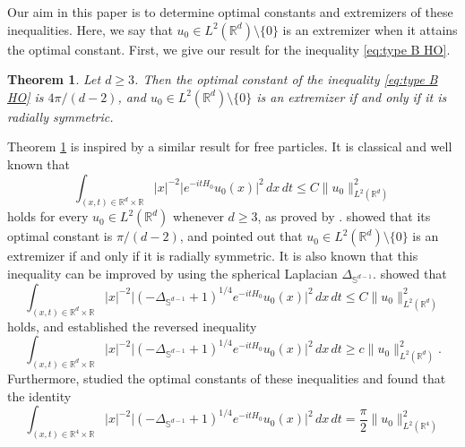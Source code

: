 \documentclass[reqno]{amsart}
\theoremstyle{plain}
\newtheorem{theorem}{Theorem}[section]
\numberwithin{equation}{section}
\theoremstyle{remark}
\newcommand{\R}{\mathbb{R}}
\renewcommand{\S}{\mathbb{S}}
\newcommand{\abs}[1]{\lvert#1\rvert}
\newcommand{\norm}[1]{\lVert#1\rVert}
\newcommand{\Hamiltonian}{H}
\newcommand{\Hamiltonianfree}{\Hamiltonian_0}
\newcommand{\Laplacian}{\Delta}
\newcommand{\LaplacianS}{\Laplacian_{\S^{d-1}}}
\begin{document}
Our aim in this paper is to determine optimal constants and extremizers of these inequalities.
Here, we say that $u_0 \in L^2(\R^d) \setminus \{0\}$ is an extremizer when it attains the optimal constant.
First, we give our result for the inequality \eqref{eq:type B HO}.
\begin{theorem} \label{main thm:type B HO}
	Let $d \geq 3$. Then the optimal constant of the inequality \eqref{eq:type B HO} is $4\pi / (d-2)$, and $u_0 \in L^2(\R^d) \setminus \{0\}$ is an extremizer if and only if it is radially symmetric.
\end{theorem}
Theorem \ref{main thm:type B HO} is inspired by a similar result for free particles. 
It is classical and well known that 
\begin{equation} \label{eq:type B free}
	\int_{(x, t) \in \R^d \times \R} \abs{x}^{-2} \abs{ e^{- i t \Hamiltonianfree} u_0(x) }^2 \, dx \, dt \leq C \norm{ u_0 }_{L^2(\R^d)}^2 
\end{equation}
holds for every $u_0 \in L^2(\R^d)$ whenever $d \geq 3$, as proved by \citet[Theorem 1]{KY1989}. 
\citet[(3)]{Sim1992} showed that its optimal constant is $\pi / (d-2)$, and \citet[Theorem 1.5]{BS2017} pointed out that $u_0 \in L^2(\R^d) \setminus \{0\}$ is an extremizer if and only if it is radially symmetric.
It is also known that this inequality can be improved by using the spherical Laplacian $\LaplacianS$.
\citet[Theorem 1.2]{Hos1997} showed that 
\begin{equation} \label{eq:type B with spherical Laplacian free}
	\int_{(x, t) \in \R^d \times \R} \abs{x}^{-2} \abs{ (-\LaplacianS + 1)^{1/4} e^{- i t \Hamiltonianfree} u_0(x) }^2 \, dx \, dt \leq C \norm{ u_0 }_{L^2(\R^d)}^2 
\end{equation}
holds, and \citet[Theorem 1.10]{FW2011} established the reversed inequality
\begin{equation} \label{eq:type B with spherical Laplacian reversed free}
	\int_{(x, t) \in \R^d \times \R} \abs{x}^{-2} \abs{ (-\LaplacianS + 1)^{1/4} e^{- i t \Hamiltonianfree} u_0(x) }^2 \, dx \, dt \geq c \norm{ u_0 }_{L^2(\R^d)}^2 .
\end{equation}
Furthermore, \citet{BS2014} studied the optimal constants of these inequalities and found that the identity
\begin{equation} \label{eq:type B identity free d=4}
	\int_{(x, t) \in \R^4 \times \R} \abs{x}^{-2} \abs{ (-\LaplacianS + 1)^{1/4} e^{- i t \Hamiltonianfree} u_0(x) }^2 \, dx \, dt = \frac{\pi}{2} \norm{ u_0 }_{L^2(\R^4)}^2
\end{equation}
\end{document}
